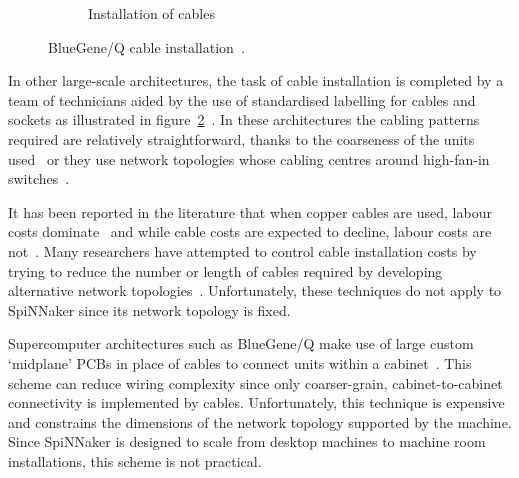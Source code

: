 \begin{figure}
\begin{subfigure}[t]{0.30\textwidth}
					\caption{Installation of cables}
					\label{fig:bgWiringInstallation}
				\end{subfigure}
				
				\caption[BlueGene/Q cable installation.]%
				        {BlueGene/Q cable installation~\cite{cscs13}.}
				\label{fig:bgWiring}
			\end{figure}
			
			In other large-scale architectures, the task of cable installation is
			completed by a team of technicians aided by the use of standardised
			labelling for cables and sockets as illustrated in
			figure~\ref{fig:bgWiring}~\cite{tia2006}. In these architectures the
			cabling patterns required are relatively straightforward, thanks to the
			coarseness of the units used~\cite{lakner07} or they use network
			topologies whose cabling centres around high-fan-in
			switches~\cite{cisco07,csernai15}.
			
			It has been reported in the literature that when copper cables are used,
			labour costs dominate~\cite{popa10} and while cable costs are expected to
			decline, labour costs are not~\cite{mudigonda11}. Many researchers have
			attempted to control cable installation costs by trying to reduce the
			number or length of cables required by developing alternative network
			topologies~\cite{curtis12, popa10, mudigonda11}.  Unfortunately, these
			techniques do not apply to SpiNNaker since its network topology is fixed.
			
			Supercomputer architectures such as BlueGene/Q make use of large custom
			`midplane' PCBs in place of cables to connect units within a
			cabinet~\cite{milano13}. This scheme can reduce wiring complexity since
			only coarser-grain, cabinet-to-cabinet connectivity is implemented by
			cables. Unfortunately, this technique is expensive and constrains the
			dimensions of the network topology supported by the machine. Since
			SpiNNaker is designed to scale from desktop machines to machine room
			installations, this scheme is not practical.
			
